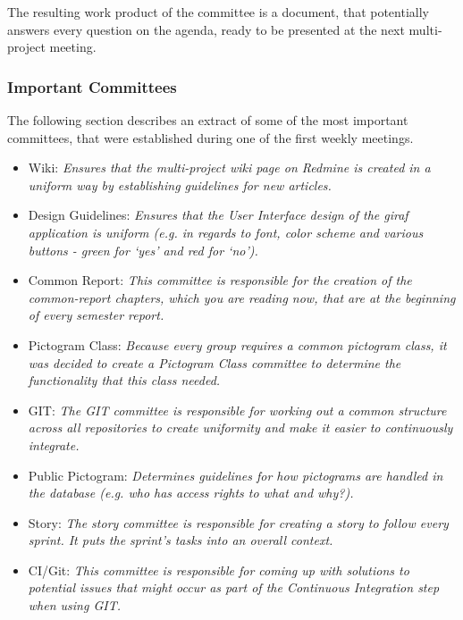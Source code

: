 The resulting work product of the committee is a document, that potentially answers every question on the agenda, ready to be presented at the next multi-project meeting.

\subsubsection*{Important Committees}
\label{subsub:importantcommittees}
The following section describes an extract of some of the most important committees, that were established during one of the first weekly meetings.

\begin{itemize}
        \item Wiki: \emph{Ensures that the multi-project wiki page on Redmine is created in a uniform way by establishing guidelines for new
        articles.}
        \item Design Guidelines: \emph{Ensures that the User Interface design of the \ac{giraf} application is uniform (e.g. in regards to font, color scheme and various buttons - green for `yes' and red for `no').}
        \item Common Report: \emph{This committee is responsible for the creation of the common-report chapters, which you are reading now, that are at the beginning of every semester report.}
        \item Pictogram Class: \emph{Because every group requires a common pictogram class, it was decided to create a Pictogram Class committee to determine the functionality that this class needed.}
        \item GIT: \emph{The GIT committee is responsible for working out a common structure across all repositories to create uniformity and make it easier to continuously integrate.}
        \item Public Pictogram: \emph{Determines guidelines for how pictograms are handled in the database (e.g. who has access rights to what and why?).}
        \item Story: \emph{The story committee is responsible for creating a story to follow every sprint. It puts the sprint's tasks into an overall context.}
        \item CI/Git: \emph{This committee is responsible for coming up with solutions to potential issues that might occur as part of the Continuous Integration step when using GIT.}
\end{itemize}
